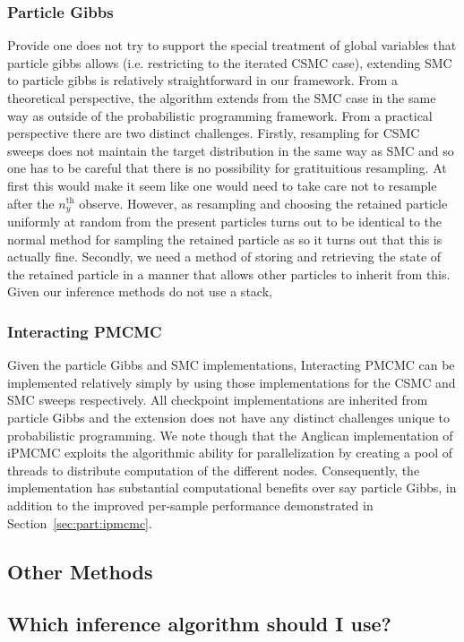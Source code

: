 \subsubsection{Particle Gibbs}
\label{sec:proginf:str:part:pgibbs}

Provide one does not try to support the special treatment of global variables that particle
gibbs allows (i.e. restricting to the iterated CSMC case), extending SMC to particle gibbs
is relatively straightforward in our framework.  From a theoretical perspective, the algorithm
extends from the SMC case in the same way as outside of the probabilistic programming framework.
From a practical perspective there are two distinct challenges.  Firstly, resampling for CSMC
sweeps does not maintain the target distribution in the same way as SMC and so one has
to be careful that there is no possibility for gratituitious resampling.  At first this would make it
seem like one would need to take care not to resample after the $n_y^{\mathrm{th}}$ observe.
However, as resampling and choosing the retained particle uniformly at random from the
present particles turns out to be identical to the normal method for sampling the retained particle
as so it turns out that this is actually fine.  Secondly, we need a method of storing and retrieving the
state of the retained particle in a manner that allows other particles to inherit from this.  Given our
inference methods do not use a stack, 


\subsubsection{Interacting PMCMC}
\label{sec:proginf:str:part:ipmcmc}

Given the particle Gibbs and SMC implementations, Interacting PMCMC can be implemented
relatively simply by using those implementations for the CSMC and SMC sweeps respectively.
All checkpoint implementations are inherited from particle Gibbs and the extension does
not have any distinct challenges unique to probabilistic programming.  We note though that
the Anglican implementation of iPMCMC exploits the algorithmic ability for parallelization 
by creating a pool of threads to distribute computation of the different nodes.   Consequently,
the implementation has substantial computational benefits over say particle Gibbs, in addition
to the improved per-sample performance demonstrated in Section~\ref{sec:part:ipmcmc}.

\subsection{Other Methods}
\label{sec:proginf:str:part:other}

\subsection{Which inference algorithm should I use?}
\label{sec:proginf:str:which}


